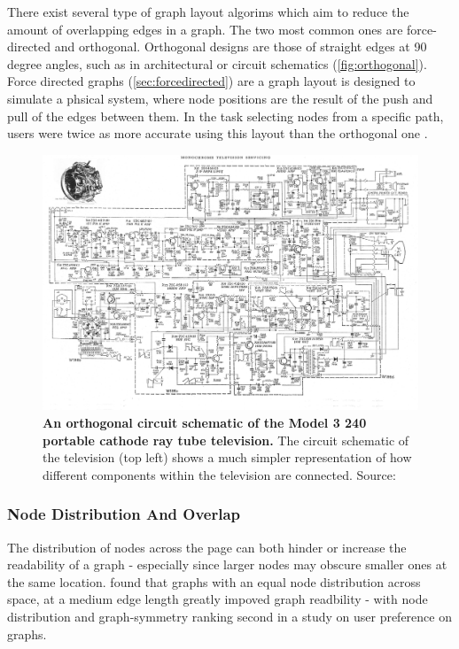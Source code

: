 There exist several type of graph layout algorims which aim to reduce the amount of overlapping edges in a graph. The two most common ones are force-directed and orthogonal. Orthogonal designs are those of straight edges at 90 degree angles, such as in architectural or circuit schematics (\autoref{fig:orthogonal}). Force directed graphs (\autoref{sec:forcedirected}) are a graph layout is designed to simulate a phsical system, where node positions are the result of the push and pull of the edges between them. In the task selecting nodes from a specific path, users were twice as more accurate using this layout than the orthogonal one \citep{eyetrack}.


\begin{figure}[H]
    \centering
        \includegraphics[width=\textwidth]{tvschematic.jpg}
       \caption{\textbf{An orthogonal circuit schematic of the Model 3 240 portable cathode ray tube television.} The circuit schematic of the television (top left) shows a much simpler representation of how different components within the television are connected.  Source: \citep{orthogonaltv} }
       \label{fig:orthogonal}
\end{figure}



    
 
\subsubsection{Node Distribution And Overlap}\label{sec:ndist}

The distribution of nodes across the page can both hinder or increase the readability of a graph - especially since larger nodes may obscure smaller ones at the same location. \cite{ch6graphredability} found that graphs with an equal node distribution across space, at a medium edge length greatly impoved graph readbility - with node distribution and graph-symmetry ranking second in a study on user preference on graphs. 

